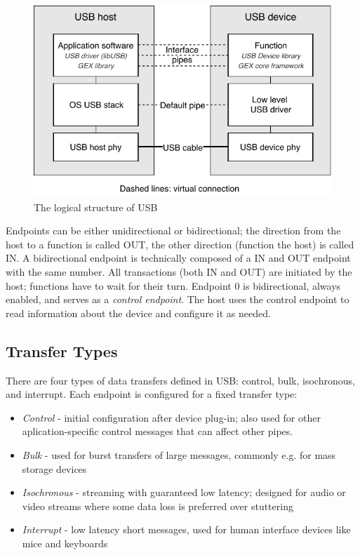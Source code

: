 \begin{figure}[h]
	\centering
	\includegraphics[scale=1] {img/usb-logical-redraw.pdf}
	\caption{\label{fig:usb-logical}The logical structure of USB}
\end{figure}

Endpoints can be either unidirectional or bidirectional; the direction from the host to a function is called OUT, the other direction (function the host) is called IN. A bidirectional endpoint is technically composed of a IN and OUT endpoint with the same number. All transactions (both IN and OUT) are initiated by the host; functions have to wait for their turn. Endpoint 0 is bidirectional, always enabled, and serves as a \textit{control endpoint}. The host uses the control endpoint to read information about the device and configure it as needed.

\subsection{Transfer Types}

There are four types of data transfers defined in \gls{USB}: control, bulk, isochronous, and interrupt. Each endpoint is configured for a fixed transfer type:

\begin{itemize}
	\item \textit{Control} - initial configuration after device plug-in; also used for other aplication-specific control messages that can affect other pipes.
	\item \textit{Bulk} - used for burst transfers of large messages, commonly e.g. for mass storage devices
	\item \textit{Isochronous} - streaming with guaranteed low latency; designed for audio or video streams where some data loss is preferred over stuttering
	\item \textit{Interrupt} - low latency short messages, used for human interface devices like mice and keyboards
\end{itemize}

